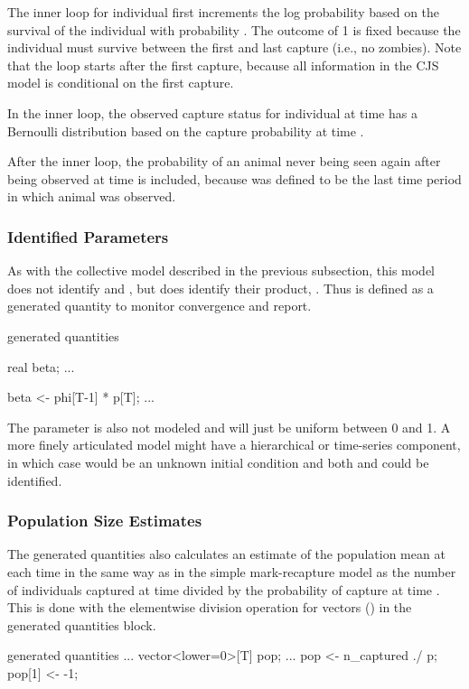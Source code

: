 The inner loop for individual  first increments the log
probability based on the survival of the individual with probability
.  The outcome of 1 is fixed because the individual
must survive between the first and last capture (i.e., no zombies).
Note that the loop starts after the first capture, because all
information in the CJS model is conditional on the first capture.

In the inner loop, the observed capture status  for
individual  at time  has a Bernoulli distribution
based on the capture probability  at time .

After the inner loop, the probability of an animal never being seen
again after being observed at time  is included, because
 was defined to be the last time period in which animal
 was observed.

\subsubsection{Identified Parameters}

As with the collective model described in the previous subsection,
this model does not identify  and , but
does identify their product, .  Thus  is defined
as a generated quantity to monitor convergence and report.
%
\begin{stancode}
generated quantities {
  real beta;
  ...

  beta <- phi[T-1] * p[T];
  ...
}
\end{stancode}
%

The parameter  is also not modeled and will just be uniform
between 0 and 1.  A more finely articulated model might have a
hierarchical or time-series component, in which case  would
be an unknown initial condition and both  and
 could be identified.

\subsubsection{Population Size Estimates}

The generated quantities also calculates an estimate of the population
mean at each time  in the same way as in the simple
mark-recapture model as the number of individuals captured at time
 divided by the probability of capture at time .  This
is done with the elementwise division operation for vectors
() in the generated quantities block.
%
\begin{stancode}
generated quantities {
  ...
  vector<lower=0>[T] pop;
  ...
  pop <- n_captured ./ p;
  pop[1] <- -1;
}
\end{stancode}

